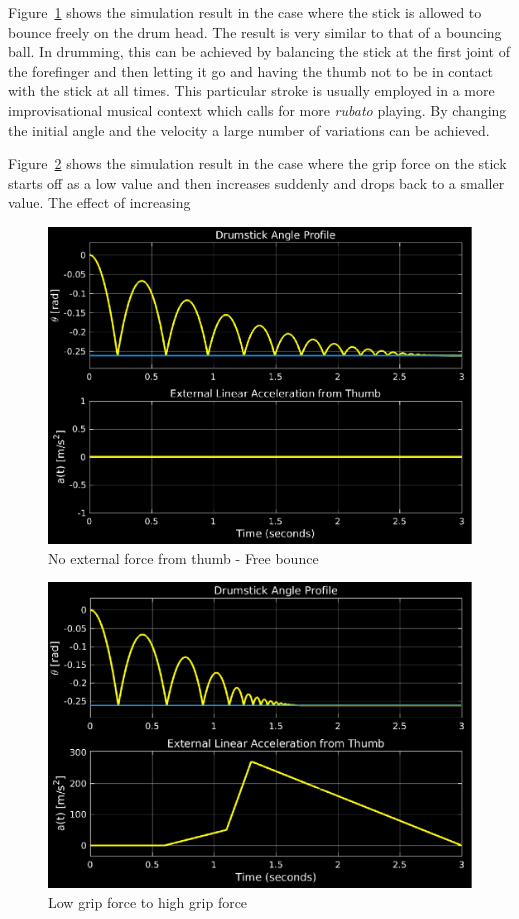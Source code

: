 \documentclass[final,1p,times]{elsarticle}
\begin{document}
Figure~\ref{NF} shows the simulation result in the case where the stick is allowed to bounce freely on the drum head. The result is very similar to that of a bouncing ball. In drumming, this can be achieved by balancing the stick at the first joint of the forefinger and then letting it go and having the thumb not to be in contact with the stick at all times. This particular stroke is usually employed in a more improvisational musical context which calls for more \textit{rubato} playing. By changing the initial angle and the velocity a large number of variations can be achieved.

Figure~\ref{LH} shows the simulation result in the case where the grip force on the stick starts off as a low value and then increases suddenly and drops back to a smaller value. The effect of increasing
\begin{figure}[H]
	\begin{center}
		\includegraphics[scale =0.65]{./figures/Fig4.eps}
		\caption{No external force from thumb - Free bounce}
		\label{NF}
	\end{center}
\end{figure}
\begin{figure}[H]
	\begin{center}
		\includegraphics[scale =0.67]{./figures/Fig5.eps}
		\caption{Low grip force to high grip force}
		\label{LH}
	\end{center}
\end{figure}
\end{document}
